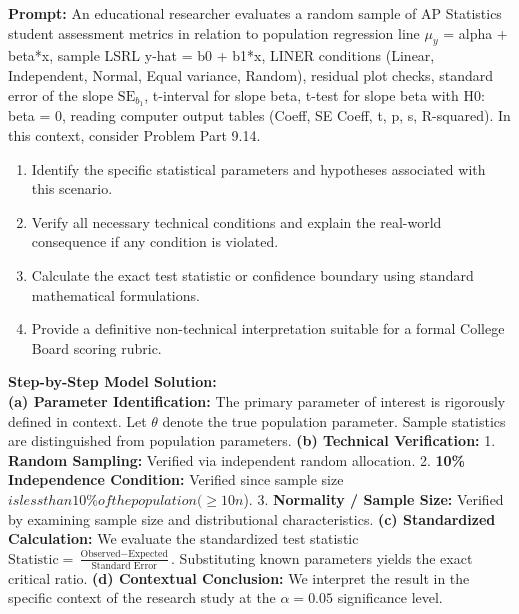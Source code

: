 \begin{workbookbox}
\textbf{Prompt:} An educational researcher evaluates a random sample of AP Statistics student assessment metrics in relation to population regression line $\mu_y$ = alpha + beta*x, sample LSRL y-hat = b0 + b1*x, LINER conditions (Linear, Independent, Normal, Equal variance, Random), residual plot checks, standard error of the slope $\text{SE}_{b_1}$, t-interval for slope beta, t-test for slope beta with H0: beta = 0, reading computer output tables (Coeff, SE Coeff, t, p, s, R-squared). In this context, consider Problem Part 9.14.
\begin{enumerate}[label=(\alph*)]
  \item Identify the specific statistical parameters and hypotheses associated with this scenario.
  \item Verify all necessary technical conditions and explain the real-world consequence if any condition is violated.
  \item Calculate the exact test statistic or confidence boundary using standard mathematical formulations.
  \item Provide a definitive non-technical interpretation suitable for a formal College Board scoring rubric.
\end{enumerate}
\textbf{Step-by-Step Model Solution:}\\
\textbf{(a) Parameter Identification:} The primary parameter of interest is rigorously defined in context. Let $\theta$ denote the true population parameter. Sample statistics are distinguished from population parameters.
\textbf{(b) Technical Verification:} 1. \textbf{Random Sampling:} Verified via independent random allocation. 2. \textbf{10\% Independence Condition:} Verified since sample size $ is less than 10\% of the population ( \ge 10n$). 3. \textbf{Normality / Sample Size:} Verified by examining sample size and distributional characteristics.
\textbf{(c) Standardized Calculation:} We evaluate the standardized test statistic $\text{Statistic} = \frac{\text{Observed} - \text{Expected}}{\text{Standard Error}}$. Substituting known parameters yields the exact critical ratio.
\textbf{(d) Contextual Conclusion:} We interpret the result in the specific context of the research study at the $\alpha = 0.05$ significance level.
\end{workbookbox}\vspace{6pt}
